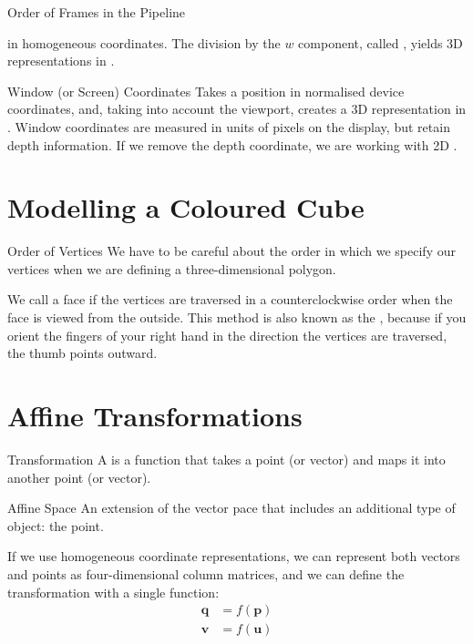 \documentclass[../COS3712_Notes.tex]{subfiles}
\begin{document}
\begin{sidenote}{Order of Frames in the Pipeline}
\begin{descriptenum}
            in homogeneous coordinates.
            The division by the $w$ component, called ,
            yields 3D representations in .
          \item[Window (or Screen) Coordinates] Takes a position in normalised device coordinates,
            and, taking into account the viewport, creates a 3D representation in
            .
            Window coordinates are measured in units of pixels on the display,
            but retain depth information.
            If we remove the depth coordinate, we are working with 2D .
        \end{descriptenum}
      \end{sidenote}

    \section{Modelling a Coloured Cube}
      \begin{sidenote}{Order of Vertices}
        We have to be careful about the order in which we specify our vertices
        when we are defining a three-dimensional polygon.

        We call a face  if the vertices are traversed in a counterclockwise
        order when the face is viewed from the outside.
        This method is also known as the , because if you orient
        the fingers of your right hand in the direction the vertices are traversed,
        the thumb points outward.
      \end{sidenote}

    \section{Affine Transformations}
      \begin{definition}{Transformation}
        A  is a function that takes a point (or vector)
        and maps it into another point (or vector).
      \end{definition}

      \begin{definition}{Affine Space}
        An extension of the vector pace that includes an additional type of object: the point.
      \end{definition}

      If we use homogeneous coordinate representations, we can represent both vectors and points
      as four-dimensional column matrices, and we can define the transformation with a single
      function:
      \begin{align*}
        \mathbf{q} &= f(\mathbf{p})\\
        \mathbf{v} &= f(\mathbf{u})
      \end{align*}
\end{document}
